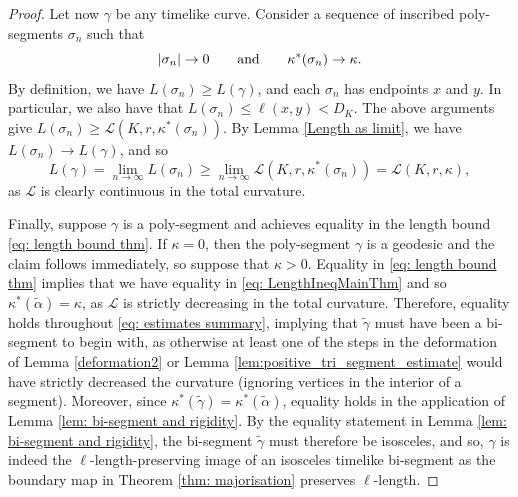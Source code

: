 \documentclass[hidelinks,12pt,a4paper]{article}
\numberwithin{equation}{section}
\theoremstyle{plain}
\theoremstyle{definition}
\begin{document}
\begin{proof}
Let now $\gamma$ be any timelike curve. 
Consider a sequence of inscribed poly-segments $\sigma_n$ such that 
\begin{equation*}
    |\sigma_n| \to 0 \qquad \textnormal{and} \qquad \kappa^*(\sigma_n) \to \kappa.
\end{equation*} 
By definition, we have $L(\sigma_n) \geq L(\gamma)$, and each $\sigma_n$ has endpoints $x$ and $y$.
In particular, we also have that $L(\sigma_n) \leq \ell(x,y) < D_K$.
The above arguments give $L(\sigma_n) \geq \mathcal{L}(K,r,\kappa^*(\sigma_n))$.
By Lemma \ref{Length as limit}, we have $L(\sigma_n) \to L(\gamma)$, and so 
\begin{equation*} 
\label{eq: LengthApproximationMainThm}
    L(\gamma) = \lim_{n \rightarrow \infty}{L(\sigma_n)} \geq \lim_{n \rightarrow \infty}\mathcal{L}(K,r,\kappa^*(\sigma_n)) = \mathcal{L}(K,r,\kappa),
\end{equation*}
as $\mathcal{L}$ is clearly continuous in the total curvature. 

Finally, suppose $\gamma$ is a poly-segment and achieves equality in the length bound \eqref{eq: length bound thm}. 
If $\kappa=0$, then the poly-segment $\gamma$ is a geodesic and the claim follows immediately, so suppose that $\kappa >0$.
Equality in \eqref{eq: length bound thm} implies that we have equality in \eqref{eq: LengthIneqMainThm} and so $\kappa^*(\tilde \alpha) = \kappa$, as $\mathcal{L}$ is strictly decreasing in the total curvature.
Therefore, equality holds throughout \eqref{eq: estimates summary}, implying that $\tilde \gamma$ must have been a bi-segment to begin with, as otherwise at least one of the steps in the deformation of Lemma \ref{deformation2} or Lemma \ref{lem:positive_tri_segment_estimate} would have strictly decreased the curvature (ignoring vertices in the interior of a segment).
Moreover, since $\kappa^*(\tilde \gamma)=\kappa^*(\tilde \alpha)$, equality holds in the application of Lemma \ref{lem: bi-segment and rigidity}. By the equality statement in Lemma \ref{lem: bi-segment and rigidity}, the bi-segment $\tilde \gamma$ must therefore be isosceles, and so, $\gamma$ is indeed the $\ell$-length-preserving image of an isosceles timelike bi-segment as the boundary map in Theorem \ref{thm: majorisation} preserves $\ell$-length.
\end{proof}
\end{document}
